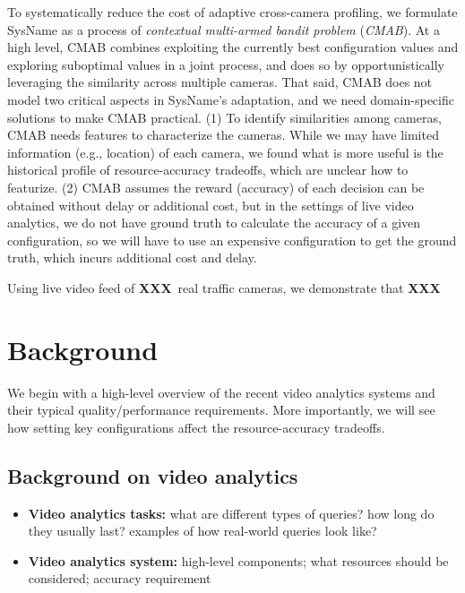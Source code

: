 \documentclass[letterpaper,twocolumn]{hotnets17}
\newcommand{\fillme}{{\bf XXX}~}
\newcommand{\name}{{SysName}\xspace}
\begin{document}
{To systematically reduce the cost of adaptive cross-camera profiling, 
we formulate \name as a process of {\em contextual multi-armed bandit problem} 
({\em CMAB}).
At a high level, CMAB combines exploiting the currently best configuration values 
and exploring suboptimal values  in a joint process, and does so by opportunistically 
leveraging the similarity across multiple cameras.
That said, CMAB does not model two critical aspects in \name's adaptation, and 
we need domain-specific solutions to make CMAB practical.
(1) To identify similarities among cameras, CMAB needs  features to characterize
the cameras. While we may have limited information
(e.g., location) of each camera, we found what is more useful is the 
historical profile of resource-accuracy tradeoffs, which are unclear how to featurize.
(2) CMAB assumes the reward (accuracy) of each decision can be obtained without
delay or additional cost, but in the settings of live video analytics, we do not have
ground truth to calculate the accuracy of a given configuration, so we will have 
to use an expensive configuration to get the ground truth, which incurs additional
cost and delay.

Using live video feed of \fillme real traffic cameras, we demonstrate that \fillme


% 


\section{Background}
We begin with a high-level overview of the recent video analytics systems and their typical quality/performance requirements. More importantly, we will see how setting key configurations affect the resource-accuracy tradeoffs.

\subsection{Background on video analytics}
\begin{itemize}
\item {\bf Video analytics tasks:} what are different types of queries? how long do they usually last? examples of how real-world queries look like?
\item {\bf Video analytics system:} high-level components; what resources should be considered; accuracy requirement
\end{itemize}

}
\end{document}
